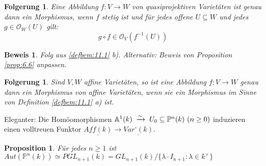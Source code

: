 \documentclass[a4paper,12pt]{report}
\theoremstyle{break}
\newtheorem{Prop}[Def]{Proposition}
\newtheorem{Folg}[Def]{Folgerung}
\theoremstyle{nonumberbreak}
\theoremstyle{nonumberplain}
\newtheorem{Bew}{Beweis}
\newcommand{\tomit}[1]{\ensuremath{\DOTSB\;\xrightarrow{#1}\;}}
\begin{document}
\begin{Folg}
  \label{folg:11.2}
  Eine Abbildung $f:V\longrightarrow W$ von quasiprojektiven Varietäten ist genau dann ein Morphismus,
  wenn $f$ stetig ist und für jedes offene $U\subseteq W$ und jedes $g\in \mathcal O_W(U)$ gilt:
  \[
  g\circ f\in\mathcal O_V(f^{-1}(U))
  \]
\end{Folg}
\begin{Bew}
  Folg aus \ref{defbem:11.1} b). Alternativ: Beweis von Proposition \ref{prop:6.6} anpassen.
\end{Bew}
\begin{Folg}
  \label{folg:11.3}
  Sind $V,W$ affine Varietäten, so ist eine Abbildung $f:V\longrightarrow W$ genau dann ein
  Morphismus von affine Varietäten, wenn sie ein Morphismus im Sinne von Definition \ref{defbem:11.1} a) ist.
\end{Folg}
Eleganter: Die Homöomorphismen $\mathbb A^1(k)\tomit{\sim}U_0\subseteq\mathbb P^n(k)\ (n\geq0)$ 
induzieren einen volltreuen Funktor $\underline{Aff(k)}\longrightarrow\underline{Var^\circ(k)}$.
 \begin{Prop}
\label{prop:11.4}
Für jedes $n \geq 1$ ist $Aut(\mathbb P^n(k)) \simeq PGL_{n+1}(k) = GL_{n+1}(k)/\{ \lambda \cdot I_{n+1} : \lambda \in k^\times \}$
\end{Prop}
\end{document}

